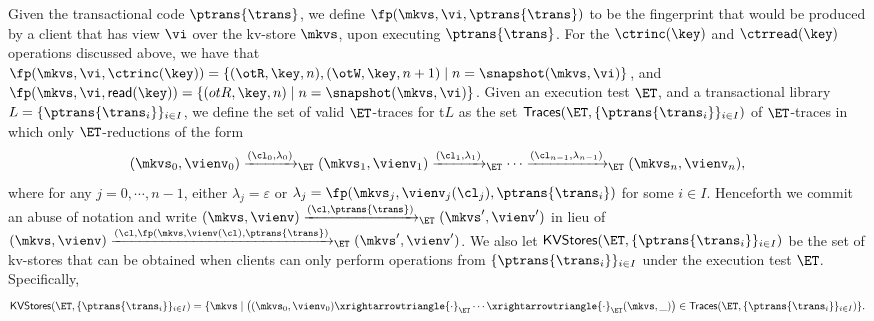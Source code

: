 Given the transactional code 
$\ptrans{\trans}$, we define $\fp(\mkvs, \vi, \ptrans{\trans})$ 
to be the fingerprint that would be produced by a client that has view $\vi$ 
over the kv-store $\mkvs$, upon executing $\ptrans{\trans}$.
For the $\ctrinc(\key)$ and $\ctrread(\key)$ operations discussed above, 
we have that 
$\fp(\mkvs, \vi, \ctrinc(\key)) = \{(\otR, \key, n), (\otW, \key, n+1) \mid 
n = \snapshot(\mkvs, \vi)\}$, and $\fp(\mkvs, \vi ,\mathsf{read}(\key)) = 
\{(otR, \key, n) \mid n = \snapshot(\mkvs, \vi)\}$.
Given an execution test $\ET$, and a transactional library $L = \{\ptrans{\trans_i}\}_{i \in I}$, 
we define the set of valid $\ET$-traces for t$L$ as the set 
$\mathsf{Traces}(\ET, \{\ptrans{\trans_i}\}_{i \in I})$ 
of $\ET$-traces in which only $\ET$-reductions of the form 
\[
(\mkvs_{0}, \vienv_{0}) \xrightarrow{(\cl_0, \lambda_0)}_{\ET} (\mkvs_{1}, \vienv_{1}) \xrightarrow{(\cl_1, \lambda_1)}_{\ET} \cdots 
\xrightarrow{(\cl_{n-1}, \lambda_{n-1})}_{\ET} (\mkvs_{n}, \vienv_{n}),
\]
where for any $j=0,\cdots,n-1$, either $\lambda_{j} = \varepsilon$ or $\lambda_{j} = \fp(\mkvs_{j}, \vienv_{j}(\cl_{j}), \ptrans{\trans_{i}})$ 
for some $i \in I$. Henceforth we commit an abuse of notation and write $(\mkvs, \vienv) \xrightarrow{(\cl, \ptrans{\trans})}_{\ET} (\mkvs', \vienv')$ 
in lieu of $(\mkvs, \vienv) \xrightarrow{(\cl, \fp(\mkvs,\vienv(\cl), \ptrans{\trans})}_{\ET} (\mkvs', \vienv')$.
We also let $\mathsf{KVStores}(\ET, \{\ptrans{\trans_i}\}_{i \in I})$ be the set of kv-stores 
that can be obtained when clients can only perform operations from $\{\ptrans{\trans_i}\}_{i \in I}$ 
under the execution test $\ET$. Specifically, 
\[
\mathsf{KVStores}(\ET, \{\ptrans{\trans_i}\}_{i \in I}) = \{ \mkvs \mid \left( (\mkvs_0, \vienv_{0}) \xrightarrowtriangle{\cdot}_{\ET} \cdots 
\xrightarrowtriangle{\cdot}_{\ET} (\mkvs, \_)\right) \in \mathsf{Traces}(\ET, \{\ptrans{\trans_{i}}\}_{i \in I}) \}.
\]

